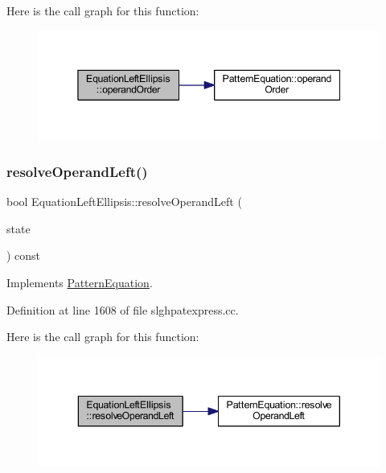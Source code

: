 Here is the call graph for this function\+:
\nopagebreak
\begin{figure}[H]
\begin{center}
\leavevmode
\includegraphics[width=345pt]{class_equation_left_ellipsis_a661203e5beadef3033ac3112353e012b_cgraph}
\end{center}
\end{figure}
\mbox{\label{class_equation_left_ellipsis_a91c58188530288eff1690528aff67c72}} 
\subsubsection{\texorpdfstring{resolveOperandLeft()}{resolveOperandLeft()}}
{\footnotesize\ttfamily bool Equation\+Left\+Ellipsis\+::resolve\+Operand\+Left (\begin{DoxyParamCaption}\item[{\mbox{\hyperlink{struct_operand_resolve}{Operand\+Resolve}} \&}]{state }\end{DoxyParamCaption}) const\hspace{0.3cm}{\ttfamily [virtual]}}



Implements \mbox{\hyperlink{class_pattern_equation_a16e885a945df91e3daf2dea6394ae6f2}{Pattern\+Equation}}.



Definition at line 1608 of file slghpatexpress.\+cc.

Here is the call graph for this function\+:
\nopagebreak
\begin{figure}[H]
\begin{center}
\leavevmode
\includegraphics[width=343pt]{class_equation_left_ellipsis_a91c58188530288eff1690528aff67c72_cgraph}
\end{center}
\end{figure}


